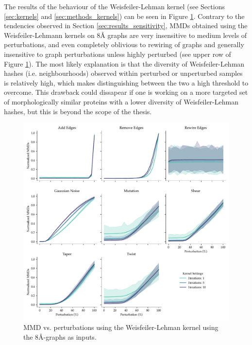 The results of the behaviour of the Weisfeiler-Lehman kernel (see Sections
\ref{sec:kernels} and \ref{sec:methods_kernels}) can be seen in Figure
\ref{fig:wlk}. Contrary to the tendencies observed in Section
\ref{sec:results_sensitivity}, MMDs obtained using the Weisfeiler-Lehmann
kernels on 8\si{\angstrom} graphs are very insensitive to medium levels of perturbations,
and even completely oblivious to rewiring of graphs and generally insensitive to
graph perturbations unless highly perturbed (see upper row of Figure \ref{fig:wlk}). The most likely explanation
is that the diversity of Weisfeiler-Lehman hashes (i.e. neighbourhoods) observed within perturbed or
unperturbed samples is relatively high, which makes distinguishing between the
two a high threshold to overcome. This drawback could dissapear if one is working on
a more targeted set of morphologically similar proteins with a lower diversity
of Weisfeiler-Lehman hashes, but this is beyond the scope of the thesis.

\begin{figure}
  \includegraphics[width=\textwidth]{./figures/results/res_3.pdf}
  \caption[MMD vs. perturbations using the Weisfeiler-Lehman kernel.]{MMD vs.
    perturbations using the Weisfeiler-Lehman kernel using the
    8\si{\angstrom}-graphs as inputs.}
  \label{fig:wlk}
\end{figure}

